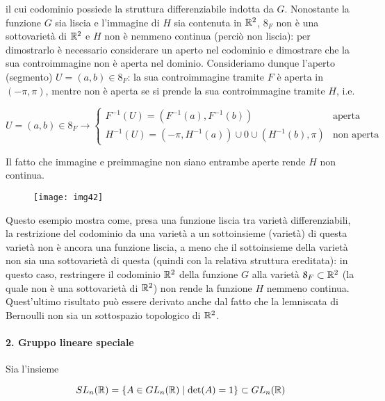 il cui codominio possiede la struttura differenziabile indotta da $ G $. Nonostante la funzione $ G $ sia liscia e l'immagine di $ H $ sia contenuta in $ \mathbb{R}^{2} $, $ \mathfrak{8}_{F} $ non è una sottovarietà di $ \mathbb{R}^{2} $ e $ H $ non è nemmeno continua (perciò non liscia): per dimostrarlo è necessario considerare un aperto nel codominio e dimostrare che la sua controimmagine non è aperta nel dominio. Consideriamo dunque l'aperto (segmento) $ U = (a,b) \in \mathfrak{8}_{F} $: la sua controimmagine tramite $ F $ è aperta in $ (-\pi,\pi) $, mentre non è aperta se si prende la sua controimmagine tramite $ H $, i.e.

\begin{equation}
	U = (a,b) \in \mathfrak{8}_{F}%
	\rightarrow%
	\begin{cases}
		F^{-1}(U) = (F^{-1}(a),F^{-1}(b)) & \text{aperta}\\
		H^{-1}(U) = (-\pi,H^{-1}(a)) \cup 0 \cup (H^{-1}(b),\pi) & \text{non aperta}
	\end{cases}
\end{equation}

Il fatto che immagine e preimmagine non siano entrambe aperte rende $ H $ non continua.

\begin{figure}[H]
	\centering
	\texttt{[image: img42]}
\end{figure}

Questo esempio mostra come, presa una funzione liscia tra varietà differenziabili, la restrizione del codominio da una varietà a un sottoinsieme (varietà) di questa varietà non è ancora una funzione liscia, a meno che il sottoinsieme della varietà non sia una sottovarietà di questa (quindi con la relativa struttura ereditata): in questo caso, restringere il codominio $ \mathbb{R}^{2} $ della funzione $ G $ alla varietà $ \mathfrak{8}_{F} \subset \mathbb{R}^{2} $ (la quale non è una sottovarietà di $ \mathbb{R}^{2} $) non rende la funzione $ H $ nemmeno continua. Quest'ultimo risultato può essere derivato anche dal fatto che la lemniscata di Bernoulli non sia un sottospazio topologico di $ \mathbb{R}^{2} $.

\paragraph{2. Gruppo lineare speciale}\label{ex-slnr}

Sia l'insieme

\begin{equation}
	SL_{n}(\mathbb{R}) = \{ A \in GL_{n}(\mathbb{R}) \mid \det(A)=1 \} \subset GL_{n}(\mathbb{R})
\end{equation}


